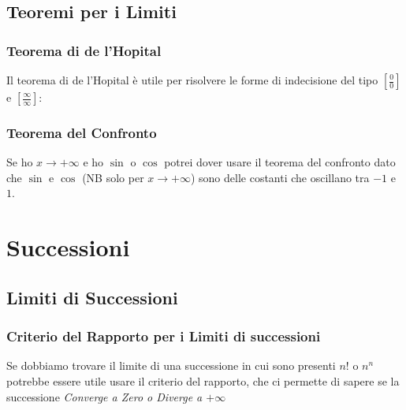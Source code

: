 \documentclass[12pt, a4paper, openany]{book}
\begin{document}
\section{Teoremi per i Limiti}
\subsection{Teorema di de l'Hopital}
Il teorema di de l'Hopital è utile per risolvere le forme di indecisione del tipo $[\frac{0}{0}]$ e $[\frac{\infty}{\infty}]$:


\subsection{Teorema del Confronto} Se ho $x \rightarrow +\infty$ e ho $\sin$ o  $\cos$ potrei dover usare
il teorema del confronto dato che $\sin$ e $\cos$ (NB solo per $x \rightarrow +\infty$)
sono delle costanti che oscillano tra $-1$ e $1$.

\chapter{Successioni}

\section{Limiti di Successioni}

\subsection{Criterio del Rapporto per i Limiti di successioni}
Se dobbiamo trovare il limite di una successione in cui sono presenti $n!$ o $n^n$
potrebbe essere utile usare il criterio del rapporto, che ci permette di sapere se la successione
\emph{Converge a Zero o Diverge a $+\infty$}
\end{document}
